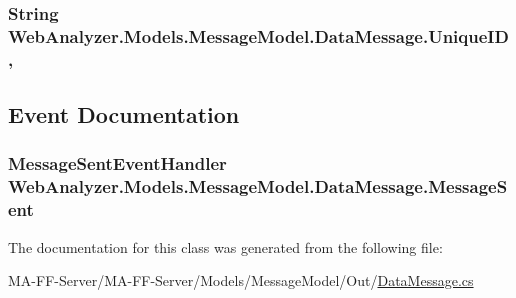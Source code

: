 \subsubsection[{Unique\+I\+D}]{\setlength{\rightskip}{0pt plus 5cm}String Web\+Analyzer.\+Models.\+Message\+Model.\+Data\+Message.\+Unique\+I\+D\hspace{0.3cm}{\ttfamily [get]}, {\ttfamily [set]}}\label{class_web_analyzer_1_1_models_1_1_message_model_1_1_data_message_af8ea083fd4035d8c786f5da12bc01917}


\subsection{Event Documentation}
\hypertarget{class_web_analyzer_1_1_models_1_1_message_model_1_1_data_message_a09dc25c903bc851fddabb0d075cca5f6}{}
\subsubsection[{Message\+Sent}]{\setlength{\rightskip}{0pt plus 5cm}Message\+Sent\+Event\+Handler Web\+Analyzer.\+Models.\+Message\+Model.\+Data\+Message.\+Message\+Sent}\label{class_web_analyzer_1_1_models_1_1_message_model_1_1_data_message_a09dc25c903bc851fddabb0d075cca5f6}


The documentation for this class was generated from the following file\+:\begin{DoxyCompactItemize}
\item 
M\+A-\/\+F\+F-\/\+Server/\+M\+A-\/\+F\+F-\/\+Server/\+Models/\+Message\+Model/\+Out/\hyperlink{_data_message_8cs}{Data\+Message.\+cs}\end{DoxyCompactItemize}
